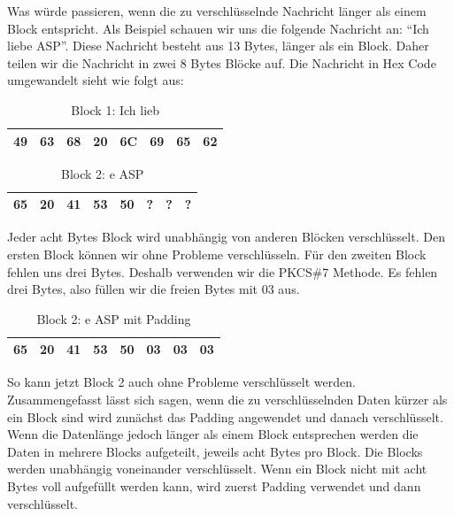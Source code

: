 \documentclass[course=asp]{aspdoc}
\begin{document}
Was würde passieren, wenn die zu verschlüsselnde Nachricht länger als einem Block entspricht. Als Beispiel schauen wir uns die folgende Nachricht an: “Ich liebe ASP”. Diese Nachricht besteht aus 13 Bytes, länger als ein Block. Daher teilen wir die Nachricht in zwei 8 Bytes Blöcke auf. Die Nachricht in Hex Code umgewandelt sieht wie folgt aus:
\begin{table}[H]
\centering
    \begin{tabular}{|l|l|l|l|l|l|l|l|}
        \hline
        49 & 63 & 68 & 20 & 6C & 69 & 65 & 62    \\
        \hline
    \end{tabular}
    \caption{Block 1: Ich lieb}
\end{table}

\begin{table}[H]
\centering
    \begin{tabular}{|l|l|l|l|l|l|l|l|}
        \hline
         65 & 20 & 41 & 53 & 50 & ?  & ? & ? \\
        \hline
    \end{tabular}
    \caption{Block 2: e ASP}
\end{table}

Jeder acht Bytes Block wird unabhängig von anderen Blöcken verschlüsselt. Den ersten Block können wir ohne Probleme verschlüsseln. Für den zweiten Block fehlen uns drei Bytes. Deshalb verwenden wir die PKCS\#7 Methode. Es fehlen drei Bytes, also füllen wir die freien Bytes mit 03 aus.

\begin{table}[H]
\centering
    \begin{tabular}{|l|l|l|l|l|l|l|l|}
        \hline
         65 & 20 & 41 & 53 & 50 & 03  & 03 & 03 \\
        \hline
    \end{tabular}
    \caption{Block 2: e ASP mit Padding}
\end{table}
So kann jetzt Block 2 auch ohne Probleme verschlüsselt werden.\\
Zusammengefasst lässt sich sagen, wenn die zu verschlüsselnden Daten kürzer als ein Block sind wird zunächst das Padding angewendet und danach verschlüsselt. Wenn die Datenlänge jedoch länger als einem Block entsprechen werden die Daten in mehrere Blocks aufgeteilt, jeweils acht Bytes pro Block. Die Blocks werden unabhängig voneinander verschlüsselt. Wenn ein Block nicht mit acht Bytes voll aufgefüllt werden kann, wird zuerst Padding verwendet und dann verschlüsselt.
\end{document}
